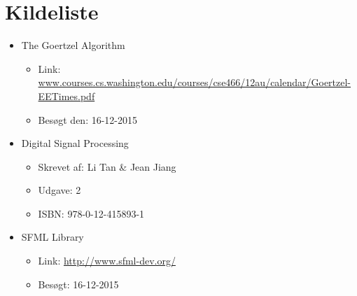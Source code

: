 \section{Kildeliste}

\begin{itemize}[noitemsep]
  \item The Goertzel Algorithm
  \begin{itemize}[noitemsep]
    \item Link: \url{www.courses.cs.washington.edu/courses/cse466/12au/calendar/Goertzel-EETimes.pdf}
    \item Besøgt den: 16-12-2015
  \end{itemize}
  
  \item Digital Signal Processing
  \begin{itemize}[noitemsep]
  	\item Skrevet af: Li Tan \& Jean Jiang
  	\item Udgave: 2
  	\item ISBN: 978-0-12-415893-1
  \end{itemize}
  
  \item SFML Library
  \begin{itemize}[noitemsep]
    \item Link: \url{http://www.sfml-dev.org/}
    \item Besøgt: 16-12-2015
  \end{itemize}
\end{itemize}